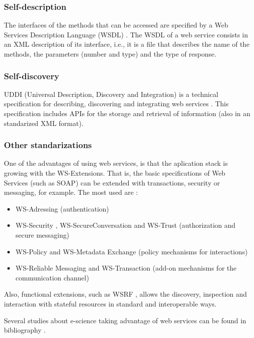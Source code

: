 \subsubsection{Self-description} The interfaces of the methods that can be accessed are specified by a Web Services Description Language (WSDL) \cite{WSDL}. The WSDL of a web service consists in an XML description of its interface, i.e., it is a file that describes the name of the methods, the parameters (number and type) and the type of response.

\subsubsection{Self-discovery} UDDI (Universal Description, Discovery and Integration) \cite{UDDI} is a technical specification for describing, discovering and integrating web services \cite{Cerami2002Webservices}. This specification includes APIs for the storage and retrieval of information (also in an standarized XML format).


\subsubsection{Other standarizations} One of the advantages of using web services, is that the aplication stack is growing with the WS-Extensions. That is, the basic specifications of Web Services (such as SOAP) can be extended with transactions, security or messaging, for example. The most used are \cite{Papazoglou2007SOA}:
\begin{itemize}
  \item WS-Adressing  (authentication)
  \item WS-Security , WS-SecureConversation  and WS-Trust  (authorization and secure messaging)
  \item WS-Policy and WS-Metadata Exchange (policy mechanisms for interactions)
  \item WS-Reliable Messaging  and WS-Transaction (add-on mechanisms for the communication channel)
\end{itemize}

Also, functional extensions, such as WSRF \cite{WSRF}, allows the discovery, inspection and interaction with stateful resources in standard and interoperable ways.

Several studies about e-science taking advantage of web services can be found in bibliography \cite{Oinn04Taverna,davidson08workflows,Ludascher06Kepler,Perera06workflows}.

